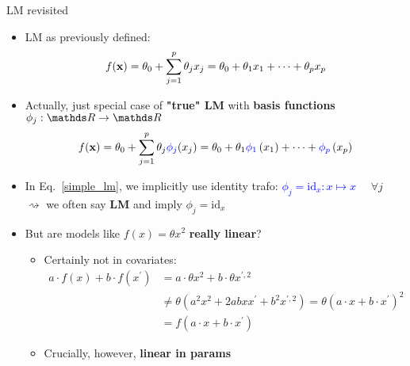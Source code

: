 \documentclass[11pt,compress,t,notes=noshow, xcolor=table]{beamer}
\begin{document}
\begin{vbframe}{LM revisited}

\begin{itemize}
    \item LM as previously defined:
    \begin{equation} \label{simple_lm}
      f(\mathbf{x}) = \theta_0 + \sum\limits_{j=1}^p \theta_j x_j =
      \theta_0 + \theta_1 x_1 + \dots + \theta_p x_p
    \end{equation}
    \item Actually, just special case of 
    \textbf{"true" LM} with \textbf{basis functions}
    \textcolor{blue}{$\phi_j: \R \rightarrow \R$}
    \begin{equation*} \label{true_lm}
      f(\mathbf{x}) = \theta_0 + \sum\limits_{j=1}^p \theta_j \textcolor{blue}{\phi_j} (x_j)
      = \theta_0 + \theta_1  \textcolor{blue}{\phi_1} \left( x_1 \right)
      + \dots + \textcolor{blue}{\phi_p} \left(x_p \right)
    \end{equation*}
    \item In Eq.~\ref{simple_lm}, we implicitly use identity trafo:
    \textcolor{blue}{$\phi_j = \text{id}_x: x \mapsto x$}~~ $\forall j$ \\
    $\rightsquigarrow$ we often say \textbf{LM} and imply
    $\phi_j = \text{id}_x$
\end{itemize}

\framebreak

\begin{itemize}
  \item But are models like $f(x) = \theta x^2$ 
  \textbf{really linear}?
  \begin{itemize}
    \item Certainly not in covariates: 
    \footnotesize
    \begin{align*}
      a \cdot f(x) + b \cdot f(x^\prime) &=
      a \cdot \theta x^2 + b \cdot \theta x^{\prime, 2} \\
      &\neq \theta (a^2x^2 + 2abx x^\prime + b^2x^{\prime, 2}) 
      = \theta (a \cdot x + b  \cdot x^\prime)^2  \\
      &= f(a \cdot x + b  \cdot x^\prime)
    \end{align*}
    \normalsize
    \item Crucially, however, \textbf{linear in params}
    

\end{itemize}
\end{itemize}
\end{vbframe}
\end{document}
